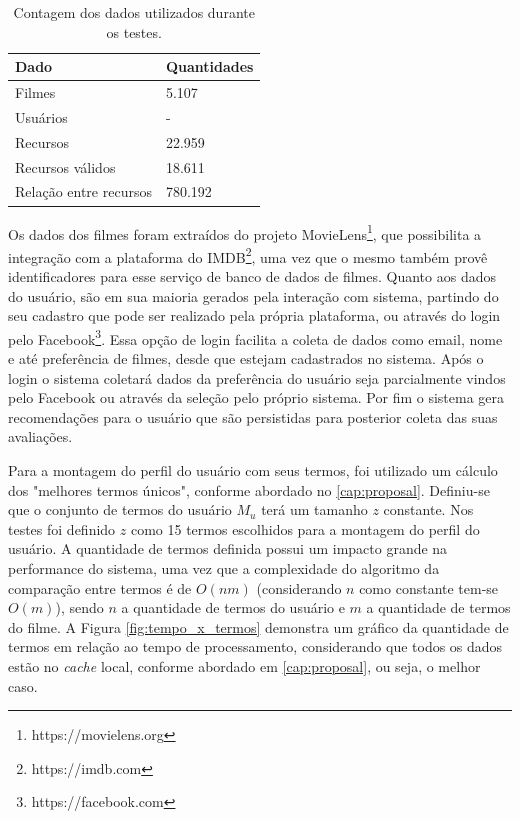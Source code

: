 \begin{table}[H]
\centering
\def\arraystretch{1.3}
\begin{tabular}{|l|l|}
	\hline
	\textbf{Dado}          & \textbf{Quantidades}   \\ \hline
	Filmes                 & 5.107                  \\ \hline
	Usuários               & - 						\\ \hline
	Recursos               & 22.959                 \\ \hline
	Recursos válidos       & 18.611                 \\ \hline
	Relação entre recursos & 780.192                \\ \hline
\end{tabular}
\caption{Contagem dos dados utilizados durante os testes.}
\label{tab:dataset}
\end{table}

Os dados dos filmes foram extraídos do projeto MovieLens\footnote{https://movielens.org}, que possibilita a integração com a plataforma do IMDB\footnote{https://imdb.com}, uma vez que o mesmo também provê identificadores para esse serviço de banco de dados de filmes. Quanto aos dados do usuário, são em sua maioria gerados pela interação com sistema, partindo do seu cadastro que pode ser realizado pela própria plataforma, ou através do login pelo Facebook\footnote{https://facebook.com}. Essa opção de login facilita a coleta de dados como email, nome e até preferência de filmes, desde que estejam cadastrados no sistema. Após o login o sistema coletará dados da preferência do usuário seja parcialmente vindos pelo Facebook ou através da seleção pelo próprio sistema. Por fim o sistema gera recomendações para o usuário que são persistidas para posterior coleta das suas avaliações.

Para a montagem do perfil do usuário com seus termos, foi utilizado um cálculo dos "melhores termos únicos", conforme abordado no \ref{cap:proposal}. Definiu-se que o conjunto de termos do usuário $M_u$ terá um tamanho $z$ constante. Nos testes foi definido $z$ como 15 termos escolhidos para a montagem do perfil do usuário. A quantidade de termos definida possui um impacto grande na performance do sistema, uma vez que a complexidade do algoritmo da comparação entre termos é de $O(nm)$ (considerando $n$ como constante tem-se $O(m)$), sendo $n$ a quantidade de termos do usuário e $m$ a quantidade de termos do filme. A Figura \ref{fig:tempo_x_termos} demonstra um gráfico da quantidade de termos em relação ao tempo de processamento, considerando que todos os dados estão no \textit{cache} local, conforme abordado em \ref{cap:proposal}, ou seja, o melhor caso.

